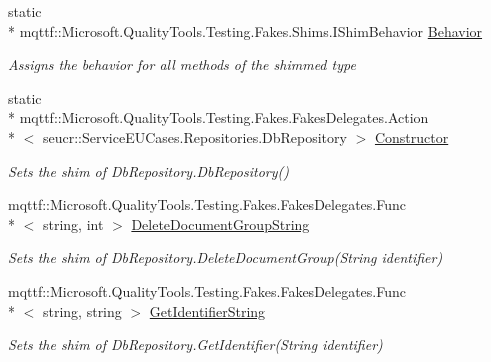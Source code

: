 \begin{DoxyCompactItemize}
static \\*
mqttf\-::\-Microsoft.\-Quality\-Tools.\-Testing.\-Fakes.\-Shims.\-I\-Shim\-Behavior \hyperlink{class_service_e_u_cases_1_1_repositories_1_1_fakes_1_1_shim_db_repository_afa8a87c3168d120e79b4a89d36382e71}{Behavior}
\begin{DoxyCompactList}\small\item\em Assigns the behavior for all methods of the shimmed type\end{DoxyCompactList}\item 
static \\*
mqttf\-::\-Microsoft.\-Quality\-Tools.\-Testing.\-Fakes.\-Fakes\-Delegates.\-Action\\*
$<$ seucr\-::\-Service\-E\-U\-Cases.\-Repositories.\-Db\-Repository $>$ \hyperlink{class_service_e_u_cases_1_1_repositories_1_1_fakes_1_1_shim_db_repository_a2d111e00d9019c70287f42375dd1d1ce}{Constructor}
\begin{DoxyCompactList}\small\item\em Sets the shim of Db\-Repository.\-Db\-Repository()\end{DoxyCompactList}\item 
mqttf\-::\-Microsoft.\-Quality\-Tools.\-Testing.\-Fakes.\-Fakes\-Delegates.\-Func\\*
$<$ string, int $>$ \hyperlink{class_service_e_u_cases_1_1_repositories_1_1_fakes_1_1_shim_db_repository_a9de2653cfad445d26a66b4d71990c707}{Delete\-Document\-Group\-String}
\begin{DoxyCompactList}\small\item\em Sets the shim of Db\-Repository.\-Delete\-Document\-Group(\-String identifier)\end{DoxyCompactList}\item 
mqttf\-::\-Microsoft.\-Quality\-Tools.\-Testing.\-Fakes.\-Fakes\-Delegates.\-Func\\*
$<$ string, string $>$ \hyperlink{class_service_e_u_cases_1_1_repositories_1_1_fakes_1_1_shim_db_repository_ac1c2c0cc606bee5942e1ed6fd873e3b2}{Get\-Identifier\-String}
\begin{DoxyCompactList}\small\item\em Sets the shim of Db\-Repository.\-Get\-Identifier(\-String identifier)\end{DoxyCompactList}\item 

\end{DoxyCompactItemize}
